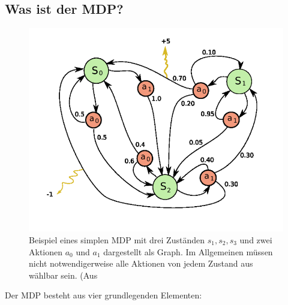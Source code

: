 \documentclass[a4paper]{IEEEtran}
\begin{document}
\subsection{Was ist der MDP?}
\begin{figure}[ht]
	\centering
	\includegraphics[scale=0.42]{images/MDP_example.png}
	\caption{Beispiel eines simplen MDP mit drei Zuständen $s_1, s_2, s_3$ und zwei Aktionen $a_0$ und $a_1$ dargestellt als Graph. Im Allgemeinen müssen nicht notwendigerweise alle Aktionen von jedem Zustand aus wählbar sein. (Aus \cite{mistWitz_MDPexample}} %
	\label{fig:holoch_MDP_example}
\end{figure}
Der MDP besteht aus vier grundlegenden Elementen:
\end{document}
